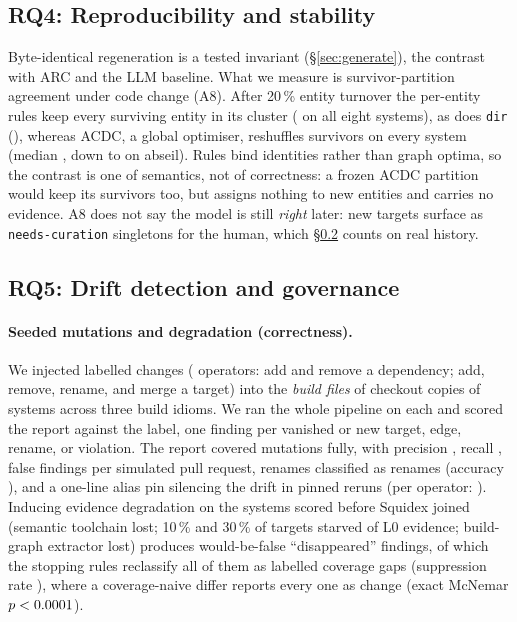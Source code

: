 \subsection{RQ4: Reproducibility and stability}
\label{sec:rq5}

Byte-identical regeneration is a tested invariant (\S\ref{sec:generate}), the contrast with ARC and
the LLM baseline. What we measure is survivor-partition agreement under code change (A8). After
20\,\% entity turnover the per-entity rules keep every surviving entity in its cluster
(\rqFivePipelineChurn{} on all eight systems), as does \texttt{dir} (\rqFiveDirChurnMedian{}),
whereas ACDC, a global optimiser, reshuffles survivors on every system (median
\rqFiveAcdcChurnMedian{}, down to \rqFiveAcdcChurnWorst{} on abseil). Rules bind identities rather
than graph optima, so the contrast is one of semantics, not of correctness: a frozen ACDC
partition would keep its survivors too, but assigns nothing to new entities and carries no
evidence. A8 does not say the model is still \emph{right} later: new targets surface as
\texttt{needs-curation} singletons for the human, which \S\ref{sec:rq6} counts on real history.

\subsection{RQ5: Drift detection and governance}
\label{sec:rq6}

\paragraph{Seeded mutations and degradation (correctness).} We injected \rqSixMutationCount{}
labelled changes (\rqSixOperatorCount{} operators: add and remove a dependency; add, remove,
rename, and merge a target) into the \emph{build files} of checkout copies of
\rqSixMutationSystems{} systems across three build idioms. We ran the whole pipeline on each and
scored the report against the label, one finding per vanished or new target, edge, rename, or
violation. The report covered \rqSixMutationsDetected{} mutations fully, with precision
\rqSixPrecision{}, recall \rqSixRecall{}, \rqSixFpPerPr{} false findings per simulated pull
request, renames classified as renames (accuracy \rqSixRenameAccuracy{}), and a one-line alias
pin silencing the drift in \rqSixAliasSurvival{} pinned reruns (per operator: \trDrift{}).
Inducing evidence degradation on the \rqSixDegradationSystems{} systems scored before Squidex
joined (semantic toolchain lost; 10\,\% and 30\,\% of targets starved of L0 evidence; build-graph
extractor lost) produces \rqSixWouldBeFalse{} would-be-false ``disappeared'' findings, of which
the stopping rules reclassify all of them as labelled coverage gaps (suppression rate
\rqSixSuppressionRate{}), where a
coverage-naive differ reports every one as change (exact McNemar $p<0.0001$).

